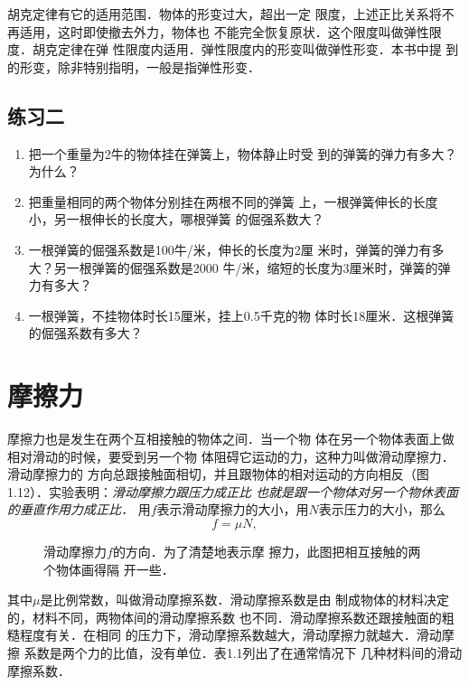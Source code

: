     胡克定律有它的适用范围．物体的形变过大，超出一定
限度，上述正比关系将不再适用，这时即使撤去外力，物体也
不能完全恢复原状．这个限度叫做\textsf{弹性限度}．胡克定律在弹
性限度内适用．弹性限度内的形变叫做\textsf{弹性形变}．本书中提
到的形变，除非特别指明，一般是指弹性形变．

\subsection*{练习二}
\begin{enumerate}
\item 把一个重量为2牛的物体挂在弹簧上，物体静止时受
到的弹簧的弹力有多大？为什么？
\item 把重量相同的两个物体分别挂在两根不同的弹簧
上，一根弹簧伸长的长度小，另一根伸长的长度大，哪根弹簧
的倔强系数大？
\item 一根弹簧的倔强系数是100牛/米，伸长的长度为2厘
米时，弹簧的弹力有多大？另一根弹簧的倔强系数是2000
牛/米，缩短的长度为3厘米时，弹簧的弹力有多大？
\item 一根弹簧，不挂物体时长15厘米，挂上0.5千克的物
体时长18厘米．这根弹簧的倔强系数有多大？
\end{enumerate}

\section{摩擦力}
    摩擦力也是发生在两个互相接触的物体之间．当一个物
体在另一个物体表面上做相对滑动的时候，要受到另一个物
体阻碍它运动的力，这种力叫做滑动摩擦力．滑动摩擦力的
方向总跟接触面相切，并且跟物体的相对运动的方向相反（图
1.12）．实验表明：\textit{滑动摩擦力跟压力成正比
也就是跟一个物体对另一个物休表面的垂直作用力成正比．}
用$f$表示滑动摩擦力的大小，用$N$表示压力的大小，那么
\[f=\mu N,\]
\begin{figure}[htp]\centering
{}
\caption{滑动摩擦力$f$的方向．为了清楚地表示摩
擦力，此图把相互接触的两个物体画得隔
开一些．
}
\end{figure}
其中$\mu$是比例常数，叫做\textsf{滑动摩擦系数}．滑动摩擦系数是由
制成物体的材料决定的，材料不同，两物体间的滑动摩擦系数
也不同．滑动摩擦系数还跟接触面的粗糙程度有关．在相同
的压力下，滑动摩擦系数越大，滑动摩擦力就越大．滑动摩擦
系数是两个力的比值，没有单位．表1.1列出了在通常情况下
几种材料间的滑动摩擦系数．

